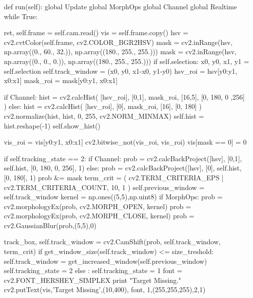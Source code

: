 \documentclass{article}
\begin{document}
\begin{python}
    def run(self):
        global Update
        global MorphOps
        global Channel
        global Realtime
        while True:

            ret, self.frame = self.cam.read()
            vis = self.frame.copy()
            hsv = cv2.cvtColor(self.frame, cv2.COLOR_BGR2HSV)
            mask = cv2.inRange(hsv, np.array((0., 60., 32.)), np.array((180., 255., 255.)))
            mask = cv2.inRange(hsv, np.array((0., 0., 0.)), np.array((180., 255., 255.)))
            if self.selection:
                x0, y0, x1, y1 = self.selection
                self.track_window = (x0, y0, x1-x0, y1-y0)
                hsv_roi = hsv[y0:y1, x0:x1]
                mask_roi = mask[y0:y1, x0:x1]

                if Channel:
                    hist = cv2.calcHist( [hsv_roi], [0,1], mask_roi, [16,5], [0, 180, 0 ,256] )
                else:
                    hist = cv2.calcHist( [hsv_roi], [0], mask_roi, [16], [0, 180] )
                cv2.normalize(hist, hist, 0, 255, cv2.NORM_MINMAX)
                self.hist = hist.reshape(-1)
                self.show_hist()

                vis_roi = vis[y0:y1, x0:x1]
                cv2.bitwise_not(vis_roi, vis_roi)
                vis[mask == 0] = 0

            if self.tracking_state == 2:
                if Channel:
                    prob = cv2.calcBackProject([hsv], [0,1], self.hist, [0, 180, 0, 256], 1)
                else:
                    prob = cv2.calcBackProject([hsv], [0], self.hist, [0, 180], 1)
                prob &= mask
                term_crit = ( cv2.TERM_CRITERIA_EPS | cv2.TERM_CRITERIA_COUNT, 10, 1 )
                self.previous_window = self.track_window
                kernel = np.ones((5,5),np.uint8)
                if MorphOps:
                    prob = cv2.morphologyEx(prob, cv2.MORPH_OPEN, kernel)
                    prob = cv2.morphologyEx(prob, cv2.MORPH_CLOSE, kernel)
                prob = cv2.GaussianBlur(prob,(5,5),0)

                track_box, self.track_window = cv2.CamShift(prob, self.track_window, term_crit)
                if get_window_size(self.track_window) <= size_treshold:
                    self.track_window = get_increased_window(self.previous_window)
                    self.tracking_state = 2
                else :
                    self.tracking_state = 1
                font = cv2.FONT_HERSHEY_SIMPLEX
                print "Target Missing."
                cv2.putText(vis,'Target Missing',(10,400), font, 1,(255,255,255),2,1)


\end{python}
\end{document}
